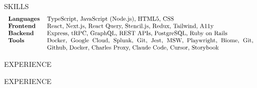 \documentclass{resume}
\begin{document}

\begin{rSection}{SKILLS}
$$\begin{tabular}{l p{12cm}} 
\textbf{Languages} & TypeScript, JavaScript (Node.js), HTML5, CSS \\ 
\textbf{Frontend} & React, Next.js, React Query, Stencil.js, Redux, Tailwind, A11y \\ 
\textbf{Backend} & Express, tRPC, GraphQL, REST APIs, PostgreSQL, Ruby on Rails \\ \textbf{Tools} & Docker, Google Cloud, Splunk, Git, Jest, MSW, Playwright, Biome, Git, Github, Docker, Charles Proxy, Claude Code, Cursor, Storybook \\ \end{tabular}$$
\end{rSection}


\begin{rSection}{EXPERIENCE}

{{EXPERIENCE}}

\end{rSection} 
\end{document}
